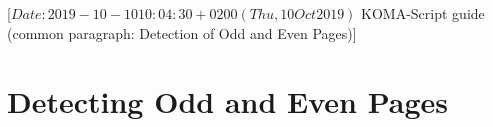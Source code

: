 %
%
%
%
%
%
%
%
% 
%
%
%
%

                 [$Date: 2019-10-10 10:04:30 +0200 (Thu, 10 Oct 2019) $
                  KOMA-Script guide (common paragraph: Detection of Odd and
                                     Even Pages)]


\section{Detecting Odd and Even Pages}
%
\BeginIndexGroup%
%
%

